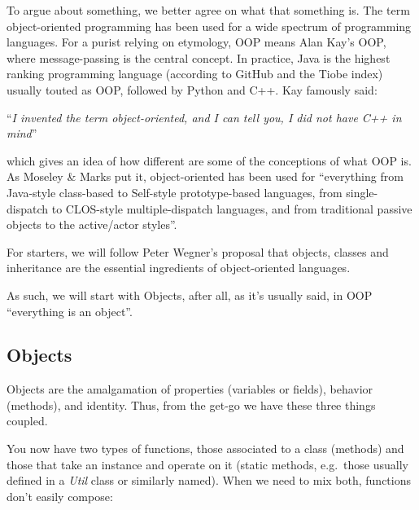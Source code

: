 \documentclass{article}
\begin{document}
To argue about something, we better agree on what that something is. The term
object-oriented programming has been used for a wide spectrum of programming
languages. For a purist relying on etymology, OOP means Alan Kay's OOP, where
message-passing is the central concept. In practice, Java is the highest
ranking programming language (according to GitHub and the Tiobe index)
usually touted as OOP, followed by Python and C++. Kay famously said\cite{Kay97}:

\begin{displayquote}
 \enquote{\textit{I invented the term object-oriented, and I can tell you, I did not
 have C++ in mind}}
\end{displayquote}

which gives an idea of how different are some of the conceptions of what OOP is.
As Moseley \& Marks put it\cite{MM06}, object-oriented has been used for \enquote{everything from Java-style
class-based to Self-style prototype-based languages, from single-dispatch to
CLOS-style multiple-dispatch languages, and from traditional passive objects
to the active/actor styles}.

For starters, we will follow Peter Wegner's proposal that objects, classes
and inheritance are the essential ingredients of object-oriented
languages\cite{Weg87}.


As such, we will start with Objects, after all, as it's usually said, in OOP
\enquote{everything is an object}.
\subsection{Objects}
Objects are the amalgamation of properties (variables or fields), behavior
(methods), and identity. Thus, from the get-go we have these three things
coupled.

You now have two types of functions, those associated to a class (methods)
and those that take an instance and operate on it (static methods, e.g.\
those usually defined in a \textit{Util} class or similarly named). When we need to mix both, functions don't easily compose:

\end{document}

